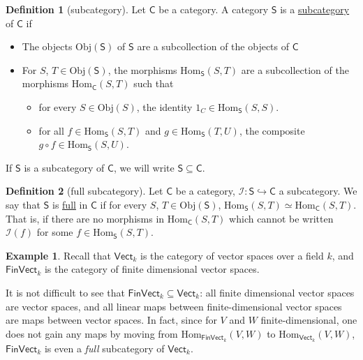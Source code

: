 \documentclass[a4paper]{report}
\newcommand{\defn}[1]{\ul{#1}}
\newcommand{\Obj}{\mathrm{Obj}}
\newcommand{\Hom}{\mathrm{Hom}}
\theoremstyle{definition}
\newtheorem{definition}{Definition}[section]
\newtheorem{example}{Example}[section]
\theoremstyle{plain}
\theoremstyle{remark}
\begin{document}
\begin{definition}[subcategory]
  \label{def:subcategory}
  Let $\mathsf{C}$ be a category. A category $\mathsf{S}$ is a \defn{subcategory} of $\mathsf{C}$ if
  \begin{itemize}
    \item The objects $\Obj(\mathsf{S})$ of $\mathsf{S}$ are a subcollection of the objects of $\mathsf{C}$

    \item For $S$, $T \in \Obj(\mathsf{S})$, the morphisms $\Hom_{\mathsf{S}}(S, T)$ are a subcollection of the morphisms $\Hom_{\mathsf{C}}(S, T)$ such that
      \begin{itemize}
        \item for every $S \in \Obj(S)$, the identity $1_{C} \in \Hom_{\mathsf{S}}(S, S)$.

        \item for all $f \in \Hom_{\mathsf{S}}(S, T)$ and $g \in \Hom_{\mathsf{S}}(T, U)$, the composite $g \circ f \in \Hom_{\mathsf{S}}(S, U)$.
      \end{itemize}
  \end{itemize} 

  If $\mathsf{S}$ is a subcategory of $\mathsf{C}$, we will write $\mathsf{S} \subseteq \mathsf{C}$.
\end{definition}

\begin{definition}[full subcategory]
  \label{def:fullsubcategory}
  Let $\mathsf{C}$ be a category, $\mathcal{I}\colon \mathsf{S} \hookrightarrow \mathsf{C}$ a subcategory. We say that $\mathsf{S}$ is \defn{full} in $\mathsf{C}$ if for every $S$, $T \in \Obj(\mathsf{S})$, $\Hom_{\mathsf{S}}(S, T) \simeq \Hom_{\mathsf{C}}(S, T)$. That is, if there are no morphisms in $\Hom_{\mathsf{C}}(S, T)$ which cannot be written $\mathcal{I}(f)$ for some $f \in \Hom_{\mathsf{S}}(S, T)$.
\end{definition}

\begin{example}
  \label{eg:finvectfullsubcategoryofvect}
  Recall that $\mathsf{Vect}_{k}$ is the category of vector spaces over a field $k$, and $\mathsf{FinVect}_{k}$ is the category of finite dimensional vector spaces. 

  It is not difficult to see that $\mathsf{FinVect}_{k} \subseteq \mathsf{Vect}_{k}$: all finite dimensional vector spaces are vector spaces, and all linear maps between finite-dimensional vector spaces are maps between vector spaces. In fact, since for $V$ and $W$ finite-dimensional, one does not gain any maps by moving from $\Hom_{\mathsf{FinVect}_{k}}(V, W)$ to $\Hom_{\mathsf{Vect}_{k}}(V, W)$, $\mathsf{FinVect}_{k}$ is even a \emph{full} subcategory of $\mathsf{Vect}_{k}$.
\end{example}
\end{document}
